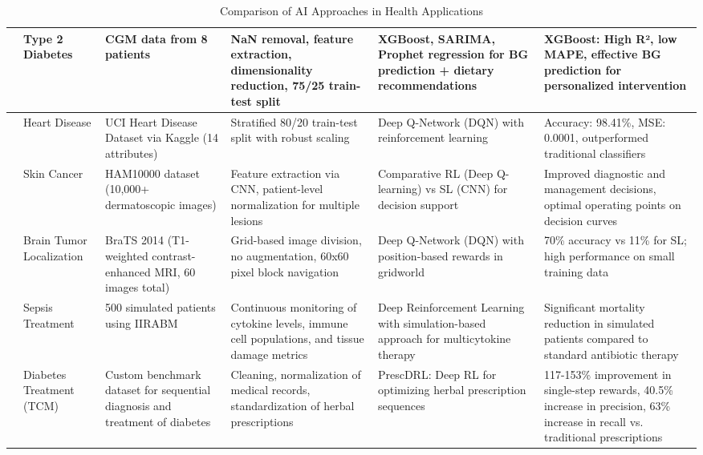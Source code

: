 \begin{table}[htbp]
\begin{adjustwidth}{-2cm}{-2cm}
\begin{tabular}{|p{1.5cm}|p{2.5cm}|p{3cm}|p{3.5cm}|p{2.5cm}|p{2.5cm}|}
\hline
\cite{article_9} & Type 2 Diabetes & CGM data from 8 patients & NaN removal, feature extraction, dimensionality reduction, 75/25 train-test split & XGBoost, SARIMA, Prophet regression for BG prediction + dietary recommendations & XGBoost: High R², low MAPE, effective BG prediction for personalized intervention \\
\hline
\cite{article_10} & Heart Disease & UCI Heart Disease Dataset via Kaggle (14 attributes) & Stratified 80/20 train-test split with robust scaling & Deep Q-Network (DQN) with reinforcement learning & Accuracy: 98.41\%, MSE: 0.0001, outperformed traditional classifiers \\
\hline
\cite{article_11} & Skin Cancer & HAM10000 dataset (10,000+ dermatoscopic images) & Feature extraction via CNN, patient-level normalization for multiple lesions & Comparative RL (Deep Q-learning) vs SL (CNN) for decision support & Improved diagnostic and management decisions, optimal operating points on decision curves \\
\hline
\cite{article_12} & Brain Tumor Localization & BraTS 2014 (T1-weighted contrast-enhanced MRI, 60 images total) & Grid-based image division, no augmentation, 60x60 pixel block navigation & Deep Q-Network (DQN) with position-based rewards in gridworld & 70\% accuracy vs 11\% for SL; high performance on small training data \\
\hline
\cite{article_13} & Sepsis Treatment & 500 simulated patients using IIRABM & Continuous monitoring of cytokine levels, immune cell populations, and tissue damage metrics & Deep Reinforcement Learning with simulation-based approach for multicytokine therapy & Significant mortality reduction in simulated patients compared to standard antibiotic therapy \\
\hline
\cite{article_14} & Diabetes Treatment (TCM) & Custom benchmark dataset for sequential diagnosis and treatment of diabetes & Cleaning, normalization of medical records, standardization of herbal prescriptions & PrescDRL: Deep RL for optimizing herbal prescription sequences & 117-153\% improvement in single-step rewards, 40.5\% increase in precision, 63\% increase in recall vs. traditional prescriptions \\
\hline
\end{tabular}
\caption{Comparison of AI Approaches in Health Applications}
\label{tab:ai_health_comparison}
\end{adjustwidth}
\end{table}
